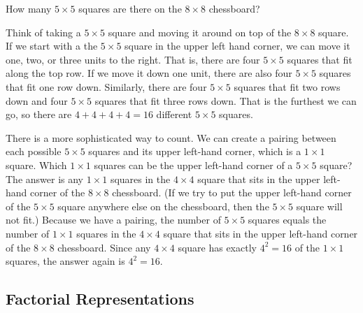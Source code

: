\begin{exam}
\label{exam_count_5x5sq}
    How many $5 \times 5$ squares are there on the $8 \times 8$ chessboard?
        \begin{soln}
            Think of taking a $5 \times 5$ square and moving it around on top of the $8 \times 8$ square.  If we start with a the $5 \times 5$ square in the upper left hand corner, we can move it one, two, or three units to the right. That is, there are four $5 \times 5$ squares that fit along the top row.  If we move it down one unit, there are also four $5 \times 5$ squares that fit one row down. Similarly, there are four $5 \times 5$ squares that fit two rows down and four $5 \times 5$ squares that fit three rows down. That is the furthest we can go, so there are $4+4+4+4=16$ different $5 \times 5$ squares.

            There is a more sophisticated way to count.  We can create a pairing between each possible $5 \times 5$ squares and its upper left-hand corner, which is a $1 \times 1$ square.  Which $1 \times 1$ squares can be the upper left-hand corner of a $5 \times 5$ square?  The answer is any $1 \times 1$ squares in the $4 \times 4$ square that sits in the upper left-hand corner of the $8 \times 8$ chessboard.  (If we try to put the upper left-hand corner of the $5 \times 5$ square anywhere else on the chessboard, then the $5 \times 5$ square will not fit.)  Because we have a pairing, the number of $5 \times 5$ squares equals the number of $1 \times 1$ squares in the $4 \times 4$ square that sits in the upper left-hand corner of the $8 \times 8$ chessboard.  Since any $4 \times 4$ square has exactly $4^2=16$ of the $1 \times 1$ squares, the answer again is $4^2=16$.
        \end{soln}
    
\end{exam}


\newcommand{\subfactrep}{Factorial Representations}
\subsection{\subfactrep}
\label{sub_factorial_rep}

